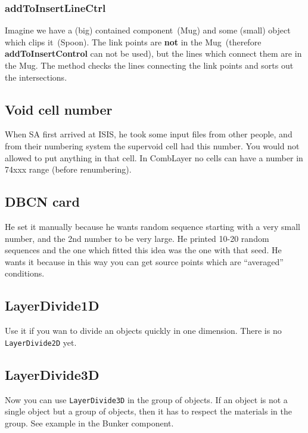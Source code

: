 \subsubsection{addToInsertLineCtrl}
Imagine we have a (big) contained component~(Mug) and some (small) object which clips it~(Spoon). The link points are {\bf not} in the Mug~(therefore {\bf addToInsertControl} can not be used), but the lines which connect them are in the Mug.
The method checks the lines connecting the link points and sorts out the intersections.

\subsection{Void cell number}
When SA first arrived at ISIS, he took some input files from other people, and from their numbering system the supervoid cell had this number.
You would not allowed to put anything in that cell. In CombLayer no cells can have a number in 74xxx range (before renumbering).

\subsection{DBCN card}
He set it manually because he wants random sequence starting with a very small number, and the 2nd number to be very large.
He printed 10-20 random sequences and the one which fitted this idea was the one with that seed.
He wants it because in this way you can get source points which are ``averaged'' conditions.

\subsection{LayerDivide1D}
Use it if you wan to divide an objects quickly in one dimension. There is no {\tt LayerDivide2D} yet.

\subsection{LayerDivide3D}
Now you can use {\tt LayerDivide3D} in the group of objects.
If an object is not a single object but a group of objects, then it has to respect the materials in the group.
See example in the Bunker component.
